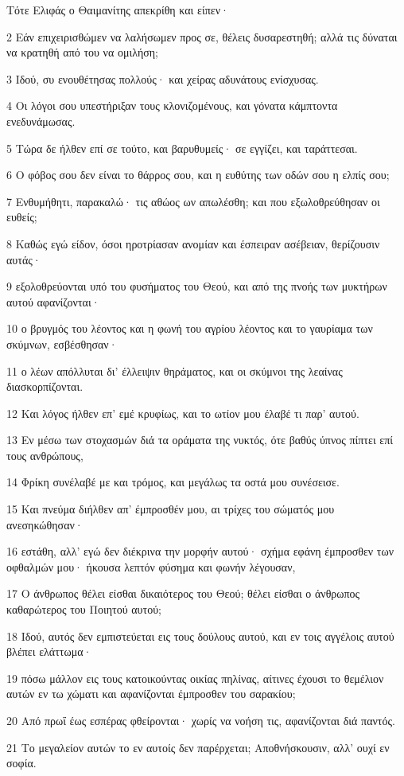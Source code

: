 \par Τότε Ελιφάς ο Θαιμανίτης απεκρίθη και είπεν·
\par 2 Εάν επιχειρισθώμεν να λαλήσωμεν προς σε, θέλεις δυσαρεστηθή; αλλά τις δύναται να κρατηθή από του να ομιλήση;
\par 3 Ιδού, συ ενουθέτησας πολλούς· και χείρας αδυνάτους ενίσχυσας.
\par 4 Οι λόγοι σου υπεστήριξαν τους κλονιζομένους, και γόνατα κάμπτοντα ενεδυνάμωσας.
\par 5 Τώρα δε ήλθεν επί σε τούτο, και βαρυθυμείς· σε εγγίζει, και ταράττεσαι.
\par 6 Ο φόβος σου δεν είναι το θάρρος σου, και η ευθύτης των οδών σου η ελπίς σου;
\par 7 Ενθυμήθητι, παρακαλώ· τις αθώος ων απωλέσθη; και που εξωλοθρεύθησαν οι ευθείς;
\par 8 Καθώς εγώ είδον, όσοι ηροτρίασαν ανομίαν και έσπειραν ασέβειαν, θερίζουσιν αυτάς·
\par 9 εξολοθρεύονται υπό του φυσήματος του Θεού, και από της πνοής των μυκτήρων αυτού αφανίζονται·
\par 10 ο βρυγμός του λέοντος και η φωνή του αγρίου λέοντος και το γαυρίαμα των σκύμνων, εσβέσθησαν·
\par 11 ο λέων απόλλυται δι' έλλειψιν θηράματος, και οι σκύμνοι της λεαίνας διασκορπίζονται.
\par 12 Και λόγος ήλθεν επ' εμέ κρυφίως, και το ωτίον μου έλαβέ τι παρ' αυτού.
\par 13 Εν μέσω των στοχασμών διά τα οράματα της νυκτός, ότε βαθύς ύπνος πίπτει επί τους ανθρώπους,
\par 14 Φρίκη συνέλαβέ με και τρόμος, και μεγάλως τα οστά μου συνέσεισε.
\par 15 Και πνεύμα διήλθεν απ' έμπροσθέν μου, αι τρίχες του σώματός μου ανεσηκώθησαν·
\par 16 εστάθη, αλλ' εγώ δεν διέκρινα την μορφήν αυτού· σχήμα εφάνη έμπροσθεν των οφθαλμών μου· ήκουσα λεπτόν φύσημα και φωνήν λέγουσαν,
\par 17 Ο άνθρωπος θέλει είσθαι δικαιότερος του Θεού; θέλει είσθαι ο άνθρωπος καθαρώτερος του Ποιητού αυτού;
\par 18 Ιδού, αυτός δεν εμπιστεύεται εις τους δούλους αυτού, και εν τοις αγγέλοις αυτού βλέπει ελάττωμα·
\par 19 πόσω μάλλον εις τους κατοικούντας οικίας πηλίνας, αίτινες έχουσι το θεμέλιον αυτών εν τω χώματι και αφανίζονται έμπροσθεν του σαρακίου;
\par 20 Από πρωΐ έως εσπέρας φθείρονται· χωρίς να νοήση τις, αφανίζονται διά παντός.
\par 21 Το μεγαλείον αυτών το εν αυτοίς δεν παρέρχεται; Αποθνήσκουσιν, αλλ' ουχί εν σοφία.

